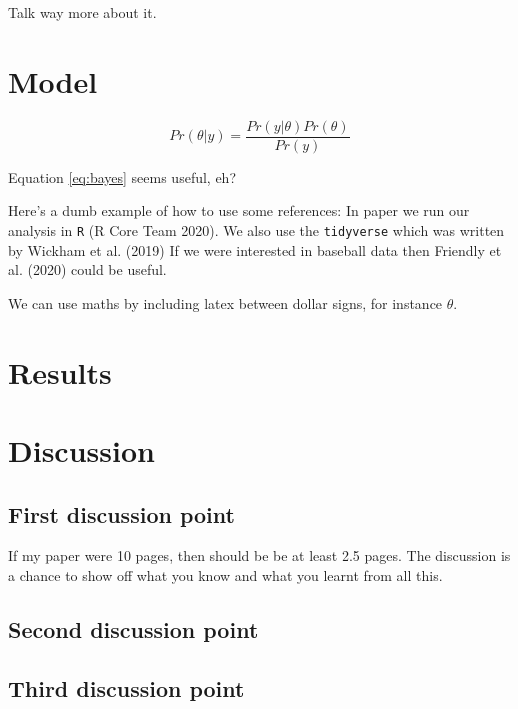 \documentclass[
]{article}
\begin{document}
Talk way more about it.

\hypertarget{model}{%
\section{Model}\label{model}}

\begin{equation}
Pr(\theta | y) = \frac{Pr(y | \theta) Pr(\theta)}{Pr(y)}  \label{eq:bayes}
\end{equation}

Equation \eqref{eq:bayes} seems useful, eh?

Here's a dumb example of how to use some references: In paper we run our analysis in \texttt{R} (R Core Team 2020). We also use the \texttt{tidyverse} which was written by Wickham et al. (2019) If we were interested in baseball data then Friendly et al. (2020) could be useful.

We can use maths by including latex between dollar signs, for instance \(\theta\).

\hypertarget{results}{%
\section{Results}\label{results}}

\hypertarget{discussion}{%
\section{Discussion}\label{discussion}}

\hypertarget{first-discussion-point}{%
\subsection{First discussion point}\label{first-discussion-point}}

If my paper were 10 pages, then should be be at least 2.5 pages. The discussion is a chance to show off what you know and what you learnt from all this.

\hypertarget{second-discussion-point}{%
\subsection{Second discussion point}\label{second-discussion-point}}

\hypertarget{third-discussion-point}{%
\subsection{Third discussion point}\label{third-discussion-point}}
\end{document}
